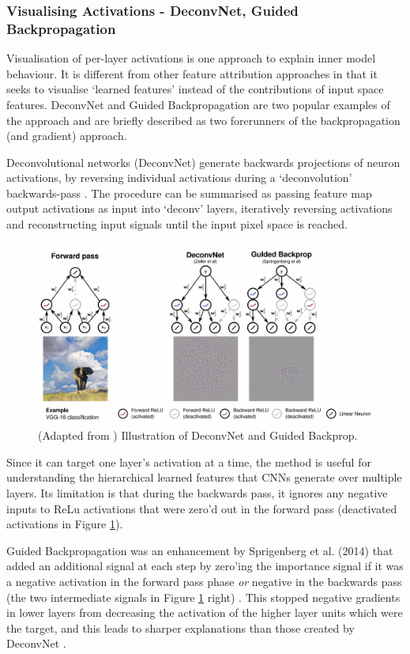 \documentclass[main]{subfiles}
\begin{document}
\subsubsection{Visualising Activations - DeconvNet, Guided Backpropagation}
Visualisation of per-layer activations is one approach to explain inner model behaviour. It is different from other feature attribution approaches in that it seeks to visualise `learned features' instead of the contributions of input space features. DeconvNet and Guided Backpropagation are two popular examples of the approach and are briefly described as two forerunners of the backpropagation (and gradient) approach.

Deconvolutional networks (DeconvNet) generate backwards projections of neuron activations, by reversing individual activations during a `deconvolution' backwards-pass \cite{zeilerfergus2013}. The procedure can be summarised as passing feature map output activations as input into `deconv' layers, iteratively reversing activations and reconstructing input signals until the input pixel space is reached.

\begin{figure}[h]
\centering
\includegraphics[scale=0.3]{deconv.png}
\caption{(Adapted from \cite{patternnet}) Illustration of DeconvNet and Guided Backprop.}
\label{deconvimg}
\end{figure}

Since it can target one layer's activation at a time, the method is useful for understanding the hierarchical learned features that CNNs generate over multiple layers. Its limitation is that during the backwards pass, it ignores any negative inputs to ReLu activations that were zero'd out in the forward pass (deactivated activations in Figure \ref{deconvimg}).

Guided Backpropagation was an enhancement by Sprigenberg et al. (2014) that added an additional signal at each step by zero'ing the importance signal if it was a negative activation in the forward pass phase \textit{or} negative in the backwards pass (the two intermediate signals in Figure \ref{deconvimg} right) \cite{springenberg}. This stopped negative gradients in lower layers from decreasing the activation of the higher layer units which were the target, and this leads to sharper explanations than those created by DeconvNet \cite{springenberg}. 
\end{document}
